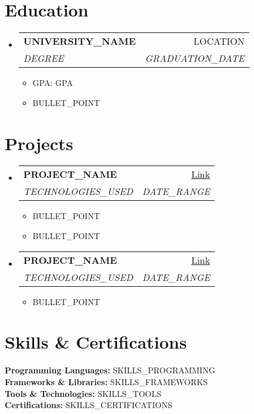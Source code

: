 \documentclass[letterpaper,10pt]{article}
\makeatletter
\newcommand{\resumeItem}[1]{
  \item\small{#1}
}
\newcommand{\resumeSubheading}[4]{
  \vspace{1pt}
  \item
    \begin{tabular*}{0.97\textwidth}[t]{l@{\extracolsep{\fill}}r}
      \textbf{#1} & #2 \\
      \textit{#3} & \textit{#4} \\
    \end{tabular*}\vspace{1pt}
}
\newcommand{\skillCategory}[2]{
  \textbf{#1:} #2\\[2pt]
}
\makeatother
\begin{document}
\section{Education}
\begin{itemize}[leftmargin=0.15in, label={}]
    \resumeSubheading
      {UNIVERSITY\_NAME}{LOCATION}
      {DEGREE}{GRADUATION\_DATE}
      \begin{itemize}[leftmargin=0.15in, label=\textbullet]
        \resumeItem{GPA: {GPA}}
        \resumeItem{BULLET\_POINT}
      \end{itemize}
\end{itemize}

\section{Projects}
\begin{itemize}[leftmargin=0.15in, label={}]
    \resumeSubheading
      {PROJECT\_NAME}{\href{PROJECT\_LINK}{Link}}
      {TECHNOLOGIES\_USED}{DATE\_RANGE}
      \begin{itemize}[leftmargin=0.15in, label=\textbullet]
        \resumeItem{BULLET\_POINT}
        \resumeItem{BULLET\_POINT}
      \end{itemize}
    
    \resumeSubheading
      {PROJECT\_NAME}{\href{PROJECT\_LINK}{Link}}
      {TECHNOLOGIES\_USED}{DATE\_RANGE}
      \begin{itemize}[leftmargin=0.15in, label=\textbullet]
        \resumeItem{BULLET\_POINT}
      \end{itemize}
\end{itemize}

\section{Skills \& Certifications}
\skillCategory{Programming Languages}{SKILLS\_PROGRAMMING}
\skillCategory{Frameworks \& Libraries}{SKILLS\_FRAMEWORKS}
\skillCategory{Tools \& Technologies}{SKILLS\_TOOLS}
\skillCategory{Certifications}{SKILLS\_CERTIFICATIONS}
\end{document}

